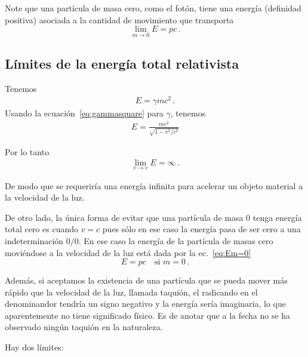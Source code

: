 \documentclass[11pt,a4paper]{book}
\begin{document}
Note que una partícula de masa cero, como el fotón, tiene una energía (definidad positiva) asociada a la cantidad de movimiento que transporta
\begin{equation}
\label{eq:Em=0}
    \lim_{m\to 0} E = pc\,.
\end{equation}

\subsection{Límites de la energía total relativista}
Tenemos
\begin{align}
\label{eq:E=gammamc2}
    \boxed{E = \gamma m c^2\,.}
\end{align}
Usando la ecuación~\eqref{eq:gammasquare} para $\gamma$, tenemos
\begin{align}
    E = \frac{m c^2}{\sqrt{1-v^2/c^2}}
\end{align}

Por lo tanto
    \begin{align}
        \lim_{v\to c} E = \infty\,.
    \end{align}


De modo que se requeriría  una energía infinita para acelerar un objeto material a la velocidad de la luz. 

De otro lado, la única forma de evitar que una partícula de masa 0 tenga energía total cero es cuando $v=c$ pues sólo en ese caso la energía pasa de ser cero a una indeterminación $0/0$. En ese caso la energía de la partícula de masas cero moviéndose a la velocidad de la luz está dada por la ec.~\eqref{eq:Em=0}
\begin{equation}
    E =pc \quad\text{si $m=0$}\,.
\end{equation}


Además, si aceptamos la existencia de una partícula que se pueda mover más rápido que la velocidad de la luz, llamada taquión, el radicando en el denominandor tendría un signo negativo y la energía sería imaginaria, lo que aparentemente no tiene significado físico. Es de anotar que a la fecha no se ha observado ningún taquión en la naturaleza.




Hay dos límites:
\end{document}
